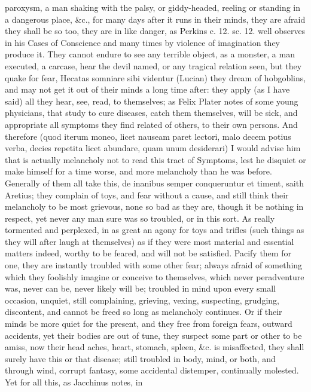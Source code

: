 {paroxysm, a man shaking with the palsy, or giddy-headed, reeling or
standing in a dangerous place, \&c., for many days after it runs in
their minds, they are afraid they shall be so too, they are in like
danger, as Perkins c. 12. sc. 12. well observes in his Cases of
Conscience and many times by violence of imagination they produce it.
They cannot endure to see any terrible object, as a monster, a man
executed, a carcase, hear the devil named, or any tragical relation
seen, but they quake for fear, Hecatas somniare sibi videntur (Lucian)
they dream of hobgoblins, and may not get it out of their minds a long
time after: they apply (as I have said) all they hear, see, read, to
themselves; as Felix Plater notes of some young physicians, that
study to cure diseases, catch them themselves, will be sick, and
appropriate all symptoms they find related of others, to their own
persons. And therefore (quod iterum moneo, licet nauseam paret lectori,
malo decem potius verba, decies repetita licet abundare, quam unum
desiderari) I would advise him that is actually melancholy not to read
this tract of Symptoms, lest he disquiet or make himself for a time
worse, and more melancholy than he was before. Generally of them all
take this, de inanibus semper conqueruntur et timent, saith Aretius;
they complain of toys, and fear without a cause, and still think
their melancholy to be most grievous, none so bad as they are, though
it be nothing in respect, yet never any man sure was so troubled, or in
this sort. As really tormented and perplexed, in as great an agony for
toys and trifles (such things as they will after laugh at themselves)
as if they were most material and essential matters indeed, worthy to
be feared, and will not be satisfied. Pacify them for one, they are
instantly troubled with some other fear; always afraid of something
which they foolishly imagine or conceive to themselves, which never
peradventure was, never can be, never likely will be; troubled in mind
upon every small occasion, unquiet, still complaining, grieving,
vexing, suspecting, grudging, discontent, and cannot be freed so long
as melancholy continues. Or if their minds be more quiet for the
present, and they free from foreign fears, outward accidents, yet their
bodies are out of tune, they suspect some part or other to be amiss,
now their head aches, heart, stomach, spleen, \&c. is misaffected, they
shall surely have this or that disease; still troubled in body, mind,
or both, and through wind, corrupt fantasy, some accidental distemper,
continually molested. Yet for all this, as Jacchinus notes, in
}
